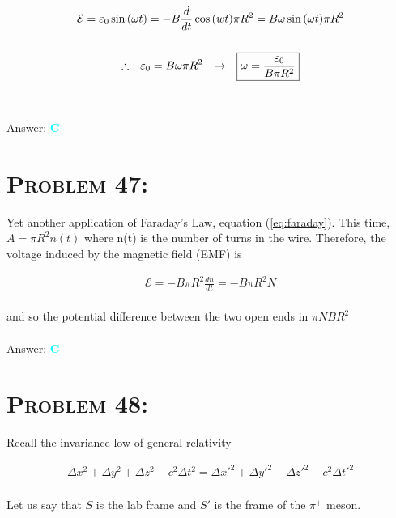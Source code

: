 \documentclass{article}
\begin{document}
\begin{gather}
\mathcal{E} = \varepsilon_{0}  \sin{(\omega t)} = -B\frac{d}{dt}\cos{(wt)}\pi R^{2} = B \omega \sin{(\omega t)} \pi R^{2}\nonumber\\
\nonumber\\
\therefore \hspace{.1in} \varepsilon_{0} = B \omega \pi R^{2} \hspace{.1in} \rightarrow \hspace{.1in} \boxed{\omega = \frac{\varepsilon_{0}}{B \pi R^{2}}}\nonumber
\end{gather}
\\\\
Answer: \textbf{\textcolor{cyan}C}\\


\section{\textsc{Problem 47:}} Yet another application of Faraday's Law, equation (\ref{eq:faraday}). This time, $A = \pi R^{2} n(t)$ where n(t) is the number of turns in the wire. Therefore, the voltage induced by the magnetic field (EMF) is 

\begin{gather}
\mathcal{E} = - B \pi R^{2} \frac{dn}{dt} = - B \pi R^{2} N
\end{gather}
\\
and so the potential difference between the two open ends in $\boxed{\pi NB R^{2}}$\\\\
Answer: \textbf{\textcolor{cyan}C}\\


\section{\textsc{Problem 48:}} Recall the invariance low of general relativity

\begin{gather}
\label{eq: interval}\Delta x^{2} + \Delta y^{2} + \Delta z^{2} - c^{2} \Delta t^{2} = \Delta x'^{2} +  \Delta y'^{2} + \Delta z'^{2} - c^{2}\Delta t'^{2} 
\end{gather}
\\
Let us say that $S$ is the lab frame and $S'$ is the frame of the $\pi^{+}$ meson.
\end{document}
